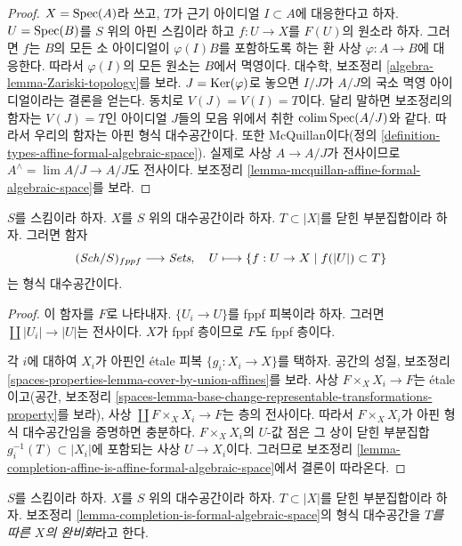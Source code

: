 \begin{proof}
$X = \mathop{\mathrm{Spec}}(A)$라 쓰고, $T$가 근기 아이디얼 $I \subset A$에
대응한다고 하자. $U = \mathop{\mathrm{Spec}}(B)$를 $S$ 위의 아핀 스킴이라 하고
$f : U \to X$를 $F(U)$의 원소라 하자. 그러면 $f$는 $B$의 모든
소 아이디얼이 $\varphi(I) B$를 포함하도록 하는 환 사상
$\varphi : A \to B$에 대응한다. 따라서 $\varphi(I)$의 모든
원소는 $B$에서 멱영이다. 대수학, 보조정리
\ref{algebra-lemma-Zariski-topology}를 보라.
$J = \mathop{\mathrm{Ker}}(\varphi)$로 놓으면 $I/J$가 $A/J$의 국소 멱영
아이디얼이라는 결론을 얻는다. 동치로 $V(J) = V(I) = T$이다.
달리 말하면 보조정리의 함자는 $V(J) = T$인 아이디얼 $J$들의
모음 위에서 취한 $\mathop{\mathrm{colim}}\nolimits \mathop{\mathrm{Spec}}(A/J)$와 같다. 따라서 우리의 함자는
아핀 형식 대수공간이다. 또한 McQuillan이다(정의
\ref{definition-types-affine-formal-algebraic-space}). 실제로 사상
$A \to A/J$가 전사이므로
$A^\wedge = \lim A/J \to A/J$도 전사이다. 보조정리
\ref{lemma-mcquillan-affine-formal-algebraic-space}를 보라.
\end{proof}

\begin{lemma}
\label{lemma-completion-is-formal-algebraic-space}
$S$를 스킴이라 하자. $X$를 $S$ 위의 대수공간이라 하자.
$T \subset |X|$를 닫힌 부분집합이라 하자. 그러면 함자
$$
(\mathit{Sch}/S)_{fppf} \longrightarrow \textit{Sets},\quad
U \longmapsto \{f : U \to X \mid f(|U|) \subset T\}
$$
는 형식 대수공간이다.
\end{lemma}

\begin{proof}
이 함자를 $F$로 나타내자. $\{U_i \to U\}$를 fppf 피복이라 하자.
그러면 $\coprod |U_i| \to |U|$는 전사이다. $X$가 fppf 층이므로
$F$도 fppf 층이다.

\medskip\noindent
각 $i$에 대하여 $X_i$가 아핀인 \'etale 피복
$\{g_i : X_i \to X\}$를 택하자. 공간의 성질, 보조정리
\ref{spaces-properties-lemma-cover-by-union-affines}를 보라.
사상 $F \times_X X_i \to F$는 \'etale이고(공간, 보조정리
\ref{spaces-lemma-base-change-representable-transformations-property}를
보라), 사상 $\coprod F \times_X X_i \to F$는 층의 전사이다.
따라서 $F \times_X X_i$가 아핀 형식 대수공간임을 증명하면
충분하다. $F \times_X X_i$의 $U$-값 점은 그 상이 닫힌 부분집합
$g_i^{-1}(T) \subset |X_i|$에 포함되는 사상 $U \to X_i$이다.
그러므로 보조정리
\ref{lemma-completion-affine-is-affine-formal-algebraic-space}에서
결론이 따라온다.
\end{proof}

\begin{definition}
\label{definition-completion}
$S$를 스킴이라 하자. $X$를 $S$ 위의 대수공간이라 하자.
$T \subset |X|$를 닫힌 부분집합이라 하자. 보조정리
\ref{lemma-completion-is-formal-algebraic-space}의 형식
대수공간을 {\it $T$를 따른 $X$의 완비화}라고 한다.
\end{definition}

